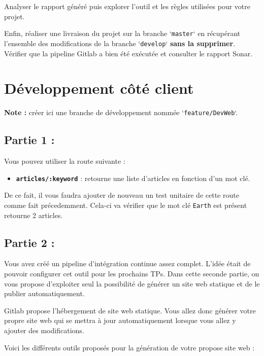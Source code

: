 \documentclass[11pt,a4paper,oneside]{article}
\begin{document}
Analyser le rapport généré puis explorer l'outil et les règles utilisées pour votre projet.

\vspace{5mm}
Enfin, réaliser une livraison du projet sur la branche `\texttt{master}` en récupérant l'ensemble des modifications de la branche `\texttt{develop}` \textbf{sans la supprimer}. Vérifier que la pipeline Gitlab a bien été exécutée et consulter le rapport Sonar.

\section{Développement côté client}

\textbf{Note :} créer ici une branche de développement nommée `\texttt{feature/DevWeb}`.

\subsection{Partie 1 :}

Vous pouvez utiliser la route suivante :

\begin{itemize}
	\item \textbf{\texttt{articles/:keyword}} : retourne une liste d'articles en fonction d'un mot clé.
\end{itemize}

De ce fait, il vous faudra ajouter de nouveau un test unitaire de cette route comme fait précedemment. Cela-ci va vérifier que le mot clé \texttt{Earth} est présent retourne 2 articles.

\subsection{Partie 2 :}

Vous avez créé un pipeline d'intégration continue assez complet. L'idée était de pouvoir configurer cet outil pour les prochains TPs. Dans cette seconde partie, on vous propose d'exploiter seul la possibilité de générer un site web statique et de le publier automatiquement.

\vspace{2mm}
Gitlab propose l'hébergement de site web statique. Vous allez donc générer votre propre site web qui se mettra à jour automatiquement lorsque vous allez y ajouter des modifications.

\vspace{2mm}
Voici les différents outils proposés pour la génération de votre propose site web :
\end{document}
